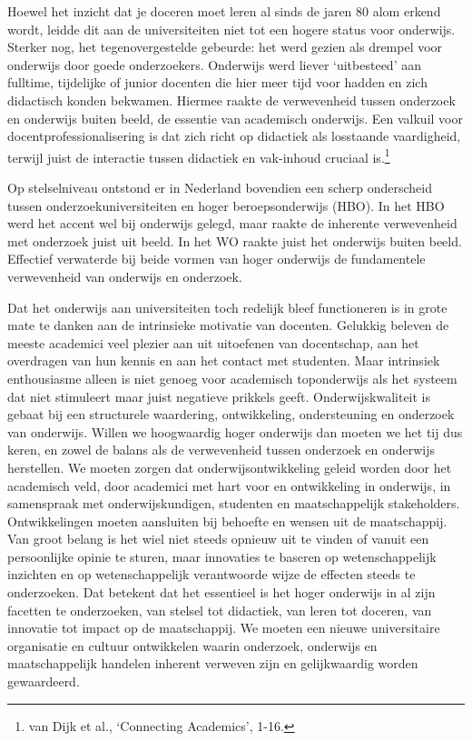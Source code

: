 \documentclass[smallauthor, chapterhaspagenum, nochapterinheader, pagenuminheader,  bigchapnum,medium2, tocpages, garamond, titleinheader]{jote-book}
\begin{document}
	Hoewel het inzicht dat je doceren moet leren al sinds de jaren 80 alom erkend wordt, leidde dit aan de universiteiten niet tot een hogere status voor onderwijs. Sterker nog, het tegenovergestelde gebeurde: het werd gezien als drempel voor onderwijs door goede onderzoekers. Onderwijs werd liever ‘uitbesteed' aan fulltime, tijdelijke of junior docenten die hier meer tijd voor hadden en zich didactisch konden bekwamen. Hiermee raakte de verwevenheid tussen onderzoek en onderwijs buiten beeld, de essentie van academisch onderwijs. Een valkuil voor docentprofessionalisering is dat zich richt op didactiek als losstaande vaardigheid, terwijl juist de interactie tussen didactiek en vak-inhoud cruciaal is.\footnote{van Dijk et al., ‘Connecting Academics', 1-16.}



	 Op stelselniveau ontstond er in Nederland bovendien een scherp onderscheid tussen onderzoekuniversiteiten en hoger beroepsonderwijs (HBO). In het HBO werd het accent wel bij onderwijs gelegd, maar raakte de inherente verwevenheid met onderzoek juist uit beeld. In het WO raakte juist het onderwijs buiten beeld. Effectief verwaterde bij beide vormen van hoger onderwijs de fundamentele verwevenheid van onderwijs en onderzoek.



	Dat het onderwijs aan universiteiten toch redelijk bleef functioneren is in grote mate te danken aan de intrinsieke motivatie van docenten. Gelukkig beleven de meeste academici veel plezier aan uit uitoefenen van docentschap, aan het overdragen van hun kennis en aan het contact met studenten. Maar intrinsiek enthousiasme alleen is niet genoeg voor academisch toponderwijs als het systeem dat niet stimuleert maar juist negatieve prikkels geeft. Onderwijskwaliteit is gebaat bij een structurele waardering, ontwikkeling, ondersteuning en onderzoek van onderwijs. Willen we hoogwaardig hoger onderwijs dan moeten we het tij dus keren, en zowel de balans als de verwevenheid tussen onderzoek en onderwijs herstellen. We moeten zorgen dat onderwijsontwikkeling geleid worden door het academisch veld, door academici met hart voor en ontwikkeling in onderwijs, in samenspraak met onderwijskundigen, studenten en maatschappelijk stakeholders. Ontwikkelingen moeten aansluiten bij behoefte en wensen uit de maatschappij. Van groot belang is het wiel niet steeds opnieuw uit te vinden of vanuit een persoonlijke opinie te sturen, maar innovaties te baseren op wetenschappelijk inzichten en op wetenschappelijk verantwoorde wijze de effecten steeds te onderzoeken. Dat betekent dat het essentieel is het hoger onderwijs in al zijn facetten te onderzoeken, van stelsel tot didactiek, van leren tot doceren, van innovatie tot impact op de maatschappij. We moeten een nieuwe universitaire organisatie en cultuur ontwikkelen waarin onderzoek, onderwijs en maatschappelijk handelen inherent verweven zijn en gelijkwaardig worden gewaardeerd.
\end{document}

